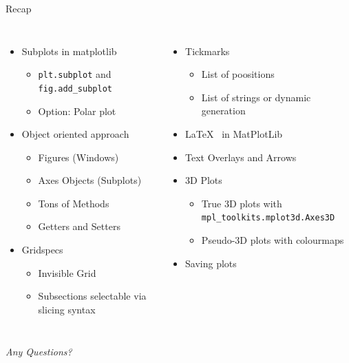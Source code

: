 
\begin{frame}[t,plain]
\titlepage
\end{frame}


\begin{frame}{Recap}
%
\begin{columns}[t]
\begin{itemize}
\item Subplots in matplotlib
	\begin{itemize}
	\item \texttt{plt.subplot} and \texttt{fig.add\_subplot}
	\item Option: Polar plot
	\end{itemize}
\item Object oriented approach
	\begin{itemize}
	\item Figures (Windows)
	\item Axes Objects (Subplots)
	\item Tons of Methods
	\item Getters and Setters
	\end{itemize}
\item Gridspecs
	\begin{itemize}
	\item Invisible Grid
	\item Subsections selectable via slicing syntax
	\end{itemize}
\end{itemize}
%
\begin{itemize}
\item Tickmarks
	\begin{itemize}
	\item List of poositions
	\item List of strings or dynamic generation
	\end{itemize}
\item \LaTeX~ in MatPlotLib
\item Text Overlays and Arrows
\item 3D Plots
	\begin{itemize}
	\item True 3D plots with \texttt{mpl\_toolkits.mplot3d.Axes3D}
	\item Pseudo-3D plots with colourmaps
	\end{itemize}
\item Saving plots
\end{itemize}

\end{columns}
%
\begin{center}
	\emph{Any Questions?}
\end{center}
%
\end{frame}

